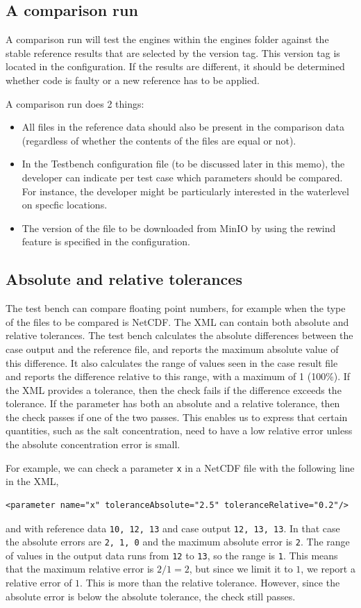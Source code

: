 \documentclass{deltares_memo}
\begin{document}
\subsection{A comparison run}
\label{ssec:runcomp}
A comparison run will test the engines within the engines folder against the stable reference results that are selected by the version tag. This version tag is located in the configuration. If the results are different, it should be determined whether code is faulty or a new reference has to be applied. 

A comparison run does 2 things:
\begin{itemize}
\item All files in the reference data should also be present in the comparison data (regardless of whether the contents of the files are equal or not). 
\item In the Testbench configuration file (to be discussed later in this memo), the developer can indicate per test case which parameters should be compared. For instance, the developer might be particularly interested in the waterlevel on specfic locations. 
\item The version of the file to be downloaded from MinIO by using the rewind feature is specified in the configuration.
\end{itemize}

\subsection{Absolute and relative tolerances}
The test bench can compare floating point numbers, for example when the type of the files to be compared is NetCDF. The XML can contain both absolute and relative tolerances. The test bench calculates the absolute differences between the case output and the reference file, and reports the maximum absolute value of this difference. It also calculates the range of values seen in the case result file and reports the difference relative to this range, with a maximum of 1 (100\%). If the XML provides a tolerance, then the check fails if the difference exceeds the tolerance. If the parameter has both an absolute and a relative tolerance, then the check passes if one of the two passes. This enables us to express that certain quantities, such as the salt concentration, need to have a low relative error unless the absolute concentration error is small.

For example, we can check a parameter \verb|x| in a NetCDF file with the following line in the XML,
\begin{verbatim}
<parameter name="x" toleranceAbsolute="2.5" toleranceRelative="0.2"/>
\end{verbatim}
and with reference data \verb|10, 12, 13| and case output \verb|12, 13, 13|. In that case the absolute errors are \verb|2, 1, 0| and the maximum absolute error is \verb|2|. The range of values in the output data runs from \verb|12| to \verb|13|, so the range is \verb|1|. This means that the maximum relative error is $2 / 1 = 2$, but since we limit it to $1$, we report a relative error of $1$. This is more than the relative tolerance. However, since the absolute error is below the absolute tolerance, the check still passes.
\end{document}
